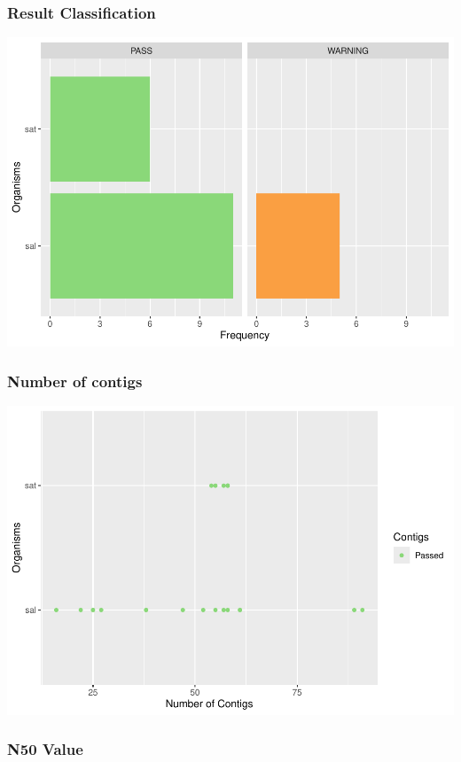\documentclass[
  a4paper,
]{article}
\begin{document}
\subsubsection{Result Classification}\label{result-classification}

\includegraphics{qualifyr_report_2024-07-28_files/figure-latex/organism results-1.pdf}

\subsubsection{Number of contigs}\label{number-of-contigs}

\includegraphics{qualifyr_report_2024-07-28_files/figure-latex/unnamed-chunk-1-1.pdf}

\subsubsection{N50 Value}\label{n50-value}
\end{document}
